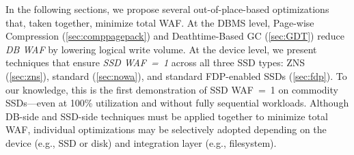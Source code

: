 In the following sections, we propose several out-of-place-based optimizations that, taken together, minimize total WAF.
At the DBMS level, Page-wise Compression (\cref{sec:comppagepack}) and Deathtime-Based GC (\cref{sec:GDT}) reduce \emph{DB WAF} by lowering logical write volume.
At the device level, we present techniques that ensure \emph{SSD WAF~=~1} across all three SSD types: ZNS (\cref{sec:zns}), standard (\cref{sec:nowa}), and standard FDP-enabled SSDs (\cref{sec:fdp}).
To our knowledge, this is the first demonstration of SSD WAF~=~1 on commodity SSDs---even at 100\% utilization and without fully sequential workloads.
Although DB-side and SSD-side techniques must be applied together to minimize total WAF, individual optimizations may be selectively adopted depending on the device (e.g., SSD or disk) and integration layer (e.g., filesystem).

